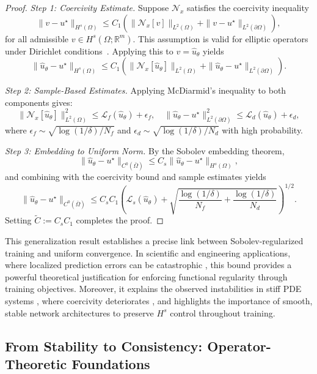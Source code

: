 \documentclass[11pt, a4paper]{article}
\begin{document}
\begin{proof}
\textit{Step 1: Coercivity Estimate.}  
Suppose $\mathcal{N}_x$ satisfies the coercivity inequality
\[
\| v - u^\star \|_{H^s(\Omega)} \leq C_1 \left( \| \mathcal{N}_x[v] \|_{L^2(\Omega)} + \| v - u^\star \|_{L^2(\partial \Omega)} \right),
\]
for all admissible $v \in H^s(\Omega; \mathbb{R}^m)$. This assumption is valid for elliptic operators under Dirichlet conditions~\cite{evans2010}. Applying this to $v = \hat{u}_\theta$ yields
\[
\| \hat{u}_\theta - u^\star \|_{H^s(\Omega)} \leq C_1 \left( \| \mathcal{N}_x[\hat{u}_\theta] \|_{L^2(\Omega)} + \| \hat{u}_\theta - u^\star \|_{L^2(\partial \Omega)} \right).
\]

\textit{Step 2: Sample-Based Estimates.}  
Applying McDiarmid’s inequality to both components gives:
\[
\| \mathcal{N}_x[\hat{u}_\theta] \|_{L^2(\Omega)}^2 \leq \mathcal{L}_f(\hat{u}_\theta) + \epsilon_f, \quad
\| \hat{u}_\theta - u^\star \|_{L^2(\partial \Omega)}^2 \leq \mathcal{L}_d(\hat{u}_\theta) + \epsilon_d,
\]
where $\epsilon_f \sim \sqrt{ \log(1/\delta)/N_f }$ and $\epsilon_d \sim \sqrt{ \log(1/\delta)/N_d }$ with high probability.

\textit{Step 3: Embedding to Uniform Norm.}  
By the Sobolev embedding theorem,
\[
\| \hat{u}_\theta - u^\star \|_{C^0(\bar{\Omega})} \leq C_s \| \hat{u}_\theta - u^\star \|_{H^s(\Omega)},
\]
and combining with the coercivity bound and sample estimates yields
\[
\| \hat{u}_\theta - u^\star \|_{C^0(\bar{\Omega})} \leq C_s C_1 \left( \mathcal{L}_s(\hat{u}_\theta) + \sqrt{ \frac{\log(1/\delta)}{N_f} + \frac{\log(1/\delta)}{N_d} } \right)^{1/2}.
\]
Setting $\tilde{C} := C_s C_1$ completes the proof.
\end{proof}

This generalization result establishes a precise link between Sobolev-regularized training and uniform convergence. In scientific and engineering applications, where localized prediction errors can be catastrophic \cite{karniadakis2021physics}, this bound provides a powerful theoretical justification for enforcing functional regularity through training objectives. Moreover, it explains the observed instabilities in stiff PDE systems \cite{ciarlet1978}, where coercivity deteriorates \cite{ciarlet2002finite}, and highlights the importance of smooth, stable network architectures to preserve $H^s$ control throughout training.

\subsection{From Stability to Consistency: Operator-Theoretic Foundations}
\end{document}
